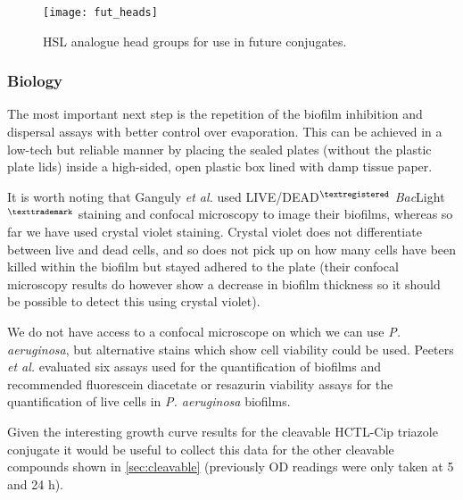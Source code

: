 \begin{figure}[H]
	\begin{center}
		\texttt{[image: fut\_heads]}
		\caption{HSL analogue head groups for use in future conjugates.
		\label{fgr:fut_heads}}
	\end{center}
\end{figure}

\subsubsection{Biology}

The most important next step is the repetition of the biofilm inhibition and dispersal assays with better control over evaporation. 
This can be achieved in a low-tech but reliable manner by placing the sealed plates (without the plastic plate lids) inside a high-sided, open plastic box lined with damp tissue paper.

It is worth noting that Ganguly \textit{et al.} used LIVE/DEAD$^{\tiny{\textregistered}}$ \textit{Bac}Light$^{\tiny{\texttrademark}}$ staining and confocal microscopy to image their biofilms, whereas so far we have used crystal violet staining. Crystal violet does not differentiate between live and dead cells, and so does not pick up on how many cells have been killed within the biofilm but stayed adhered to the plate (their confocal microscopy results do however show a decrease in biofilm thickness so it should be possible to detect this using crystal violet).

We do not have access to a confocal microscope on which we can use \textit{P. aeruginosa}, but alternative stains which show cell viability could be used. Peeters \textit{et al.}\cite{Peeters2008} evaluated six assays used for the quantification of biofilms and recommended fluorescein diacetate or resazurin viability assays for the quantification of live cells in \textit{P. aeruginosa} biofilms.

Given the interesting growth curve results for the cleavable HCTL-Cip triazole conjugate  it would be useful to collect this data for the other cleavable compounds shown in \ref{sec:cleavable} (previously OD readings were only taken at 5 and 24 h). 